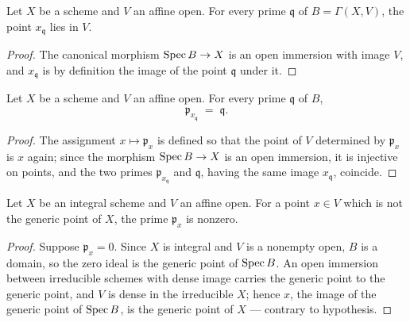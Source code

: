 \begin{lemma}
  \label{pa-lem:fromSpec_base_mem}
  \leanok

  Let \(X\) be a scheme and \(V\) an affine open. For every prime \(\mathfrak q\) of
  \(B = \Gamma(X, V)\), the point \(x_{\mathfrak q}\) lies in \(V\).
\end{lemma}
\begin{proof}
  \leanok
  The canonical morphism \(\operatorname{Spec} B \to X\) is an open immersion with image \(V\), and
  \(x_{\mathfrak q}\) is by definition the image of the point \(\mathfrak q\) under it.
\end{proof}

\begin{lemma}
  \label{pa-lem:primeIdealOf_fromSpec_base}
  \leanok

  Let \(X\) be a scheme and \(V\) an affine open. For every prime \(\mathfrak q\) of
  \(B\),
  \[
    \mathfrak p_{x_{\mathfrak q}} \;=\; \mathfrak q .
  \]
\end{lemma}
\begin{proof}
  \leanok
  The assignment \(x \mapsto \mathfrak p_x\) is defined so that the point of \(V\)
  determined by \(\mathfrak p_x\) is \(x\) again; since the morphism
  \(\operatorname{Spec} B \to X\) is an open immersion, it is injective on points, and the two
  primes \(\mathfrak p_{x_{\mathfrak q}}\) and \(\mathfrak q\), having the same image
  \(x_{\mathfrak q}\), coincide.
\end{proof}

\begin{lemma}
  \label{pa-lem:primeIdealOf_ne_bot}
  \leanok

  Let \(X\) be an integral scheme and \(V\) an affine open. For a point \(x \in V\)
  which is not the generic point of \(X\), the prime \(\mathfrak p_x\) is nonzero.
\end{lemma}
\begin{proof}
  \leanok
  Suppose \(\mathfrak p_x = 0\). Since \(X\) is integral and \(V\) is a nonempty open,
  \(B\) is a domain, so the zero ideal is the generic point of \(\operatorname{Spec} B\). An open
  immersion between irreducible schemes with dense image carries the generic point to
  the generic point, and \(V\) is dense in the irreducible \(X\); hence \(x\), the
  image of the generic point of \(\operatorname{Spec} B\), is the generic point of \(X\) ---
  contrary to hypothesis.
\end{proof}

